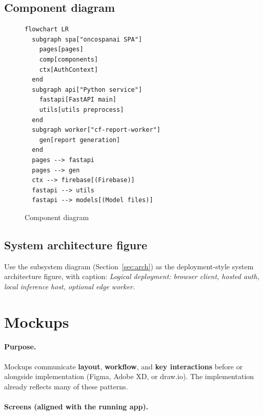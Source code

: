 \subsection{Component diagram}

\begin{figure}[htbp]
  \centering
  \begin{minipage}{0.92\textwidth}
  \begin{lstlisting}
flowchart LR
  subgraph spa["oncospanai SPA"]
    pages[pages]
    comp[components]
    ctx[AuthContext]
  end
  subgraph api["Python service"]
    fastapi[FastAPI main]
    utils[utils preprocess]
  end
  subgraph worker["cf-report-worker"]
    gen[report generation]
  end
  pages --> fastapi
  pages --> gen
  ctx --> firebase[(Firebase)]
  fastapi --> utils
  fastapi --> models[(Model files)]
  \end{lstlisting}
  \end{minipage}
  \caption{Component diagram}
\end{figure}

\subsection{System architecture figure}

Use the subsystem diagram (Section~\ref{sec:arch}) as the deployment-style system architecture figure, with caption: \textit{Logical deployment: browser client, hosted auth, local inference host, optional edge worker.}

\section{Mockups}
\label{sec:mockups}

\paragraph{Purpose.}
Mockups communicate \textbf{layout}, \textbf{workflow}, and \textbf{key interactions} before or alongside implementation (Figma, Adobe XD, or draw.io). The implementation already reflects many of these patterns.

\paragraph{Screens (aligned with the running app).}

